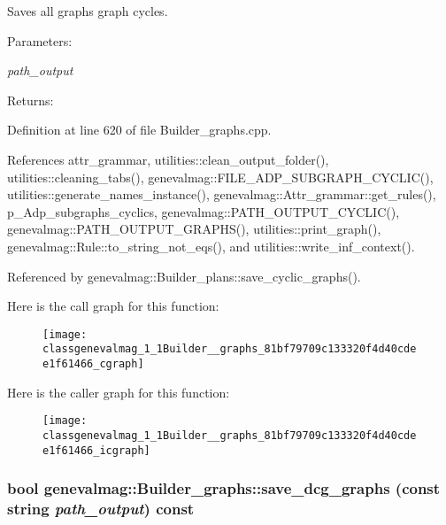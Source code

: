 Saves all graphs graph cycles. \begin{Desc}
\item[Parameters:]
\begin{description}
\item[{\em path\_\-output}]\end{description}
\end{Desc}
\begin{Desc}
\item[Returns:]\end{Desc}


Definition at line 620 of file Builder\_\-graphs.cpp.

References attr\_\-grammar, utilities::clean\_\-output\_\-folder(), utilities::cleaning\_\-tabs(), genevalmag::FILE\_\-ADP\_\-SUBGRAPH\_\-CYCLIC(), utilities::generate\_\-names\_\-instance(), genevalmag::Attr\_\-grammar::get\_\-rules(), p\_\-Adp\_\-subgraphs\_\-cyclics, genevalmag::PATH\_\-OUTPUT\_\-CYCLIC(), genevalmag::PATH\_\-OUTPUT\_\-GRAPHS(), utilities::print\_\-graph(), genevalmag::Rule::to\_\-string\_\-not\_\-eqs(), and utilities::write\_\-inf\_\-context().

Referenced by genevalmag::Builder\_\-plans::save\_\-cyclic\_\-graphs().

Here is the call graph for this function:\nopagebreak
\begin{figure}[H]
\begin{center}
\leavevmode
\texttt{[image: classgenevalmag\_1\_1Builder\_\_graphs\_81bf79709c133320f4d40cdee1f61466\_cgraph]}
\end{center}
\end{figure}


Here is the caller graph for this function:\nopagebreak
\begin{figure}[H]
\begin{center}
\leavevmode
\texttt{[image: classgenevalmag\_1\_1Builder\_\_graphs\_81bf79709c133320f4d40cdee1f61466\_icgraph]}
\end{center}
\end{figure}
\hypertarget{classgenevalmag_1_1Builder__graphs_572e65e40e16066f068c82af178c22c2}{
\subsubsection[{save\_\-dcg\_\-graphs}]{\setlength{\rightskip}{0pt plus 5cm}bool genevalmag::Builder\_\-graphs::save\_\-dcg\_\-graphs (const string {\em path\_\-output}) const}}
\label{classgenevalmag_1_1Builder__graphs_572e65e40e16066f068c82af178c22c2}


